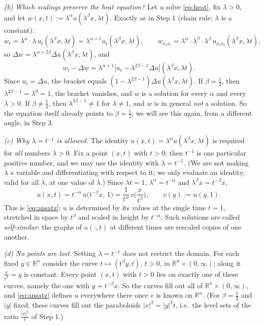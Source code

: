 \documentclass[11pt]{article}
\theoremstyle{plain}
\theoremstyle{definition}
\theoremstyle{remark}
\begin{document}
\emph{(b) Which scalings preserve the heat equation?} Let $u$ solve \eqref{eq:heat}, fix $\lambda > 0$, and let $w(x,t) := \lambda^\alpha u(\lambda^\beta x, \lambda t)$. Exactly as in Step 1 (chain rule; $\lambda$ is a constant):
$$ w_t = \lambda^{\alpha}\cdot\lambda\, u_t(\lambda^\beta x, \lambda t) = \lambda^{\alpha+1} u_t(\lambda^\beta x,\lambda t), \qquad w_{x_i x_i} = \lambda^\alpha\cdot\lambda^\beta\cdot\lambda^\beta\, u_{x_ix_i}(\lambda^\beta x,\lambda t), $$
so $\Delta w = \lambda^{\alpha+2\beta}\Delta u(\lambda^\beta x,\lambda t)$, and
$$ w_t - \Delta w = \lambda^{\alpha+1}\Big[u_t - \lambda^{2\beta - 1}\Delta u\Big](\lambda^\beta x, \lambda t). $$
Since $u_t = \Delta u$, the bracket equals $(1 - \lambda^{2\beta-1})\Delta u(\lambda^\beta x,\lambda t)$. If $\beta = \frac12$, then $\lambda^{2\beta-1} = \lambda^0 = 1$, the bracket vanishes, and $w$ is a solution for every $\alpha$ and every $\lambda > 0$. If $\beta \neq \frac12$, then $\lambda^{2\beta - 1} \neq 1$ for $\lambda \ne 1$, and $w$ is in general \emph{not} a solution. So the equation itself already points to $\beta = \frac12$; we will see this again, from a different angle, in Step 3.

\emph{(c) Why $\lambda = t^{-1}$ is allowed.} The identity $u(x,t) = \lambda^\alpha u(\lambda^\beta x,\lambda t)$ is required for \emph{all} numbers $\lambda > 0$. Fix a point $(x,t)$ with $t > 0$; then $t^{-1}$ is one particular positive number, and we may use the identity with $\lambda = t^{-1}$. (We are not making $\lambda$ a variable and differentiating with respect to it; we only evaluate an identity, valid for all $\lambda$, at one value of $\lambda$.) Since $\lambda t = 1$, $\lambda^\alpha = t^{-\alpha}$ and $\lambda^\beta x = t^{-\beta}x$,
$$ u(x,t) = t^{-\alpha}\, u\big(t^{-\beta}x,\, 1\big) = \frac{1}{t^\alpha}\, v\Big(\frac{x}{t^\beta}\Big), \qquad v(y) := u(y,1). $$
This is \eqref{eq:ansatz}: $u$ is determined by its values at the single time $t = 1$, stretched in space by $t^\beta$ and scaled in height by $t^{-\alpha}$. Such solutions are called \emph{self-similar}: the graphs of $u(\cdot,t)$ at different times are rescaled copies of one another.

\emph{(d) No points are lost.} Setting $\lambda = t^{-1}$ does not restrict the domain. For each fixed $y \in \mathbb{R}^n$ consider the curve $t \mapsto (t^\beta y, t)$, $t > 0$, in $\mathbb{R}^n\times(0,\infty)$; along it $\frac{x}{t^\beta} = y$ is constant. Every point $(x,t)$ with $t > 0$ lies on exactly one of these curves, namely the one with $y = t^{-\beta}x$. So the curves fill out all of $\mathbb{R}^n \times (0,\infty)$, and \eqref{eq:ansatz} defines $u$ everywhere there once $v$ is known on $\mathbb{R}^n$. (For $\beta = \frac12$ and $|y|$ fixed, these curves fill out the paraboloids $|x|^2 = |y|^2 t$, i.e.\ the level sets of the ratio $\frac{|x|^2}{t}$ of Step 1.)
\end{document}
